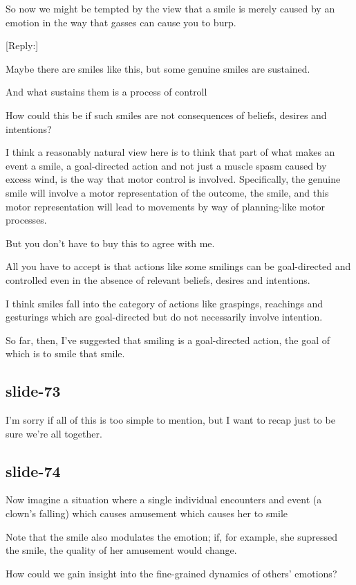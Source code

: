 \documentclass[12pt,\papersize]{extarticle}
\begin{document}
So now we might be tempted by the view that a smile is merely caused by an emotion in the way that gasses can cause you to burp.

[Reply:]

Maybe there are smiles like this, but some genuine smiles are sustained.

And what sustains them is a process of controll

How could this be if such smiles are not consequences of beliefs, desires and intentions?

I think a reasonably natural view here is to think that part of what makes an event a smile, a goal-directed action and not just a muscle spasm caused by excess wind, is the way that motor control is involved.  Specifically, the genuine smile will involve a motor representation of the outcome, the smile, and this motor representation will lead to movements by way of planning-like motor processes.

But you don't have to buy this to agree with me.

All you have to accept is that actions like some smilings can be goal-directed and controlled even in the absence of relevant beliefs, desires and intentions.

I think smiles fall into the category of actions like graspings, reachings and gesturings which are goal-directed but do not necessarily involve intention.



So far, then, I've suggested that smiling is a goal-directed action, the goal of which is to smile that smile.

\subsection{slide-73}
I'm sorry if all of this is too simple to mention, but I want to recap just to be sure we're all together.

\subsection{slide-74}
Now imagine a situation where a single individual encounters and event (a clown’s falling) which causes amusement which causes her to smile

Note that the smile also modulates the emotion; if, for example, she supressed the smile, the quality of her amusement would change.

How could we gain insight into the fine-grained dynamics of others’ emotions?
\end{document}
